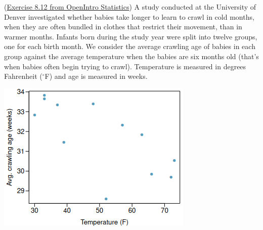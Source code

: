 \documentclass[12pt,answers]{exam}
\begin{document}
\begin{questions}
\question (\href{http://people.hsc.edu/faculty-staff/blins/books/OpenIntroStats4e.pdf\#eoce.8.12}{Exercise 8.12 from OpenIntro Statistics}) A study conducted at the University of Denver investigated whether babies
take longer to learn to crawl in cold months, when they are often bundled in clothes that restrict their
movement, than in warmer months. Infants born during the study year were split into twelve groups, one
for each birth month. We consider the average crawling age of babies in each group against the average temperature when the babies are six months old (that’s when babies often begin trying to crawl). Temperature
is measured in degrees Fahrenheit ($^\circ$F) and age is measured in weeks.
\begin{center}
\includegraphics[scale=0.6]{babies.png}
\end{center}



\end{questions}
\end{document}
